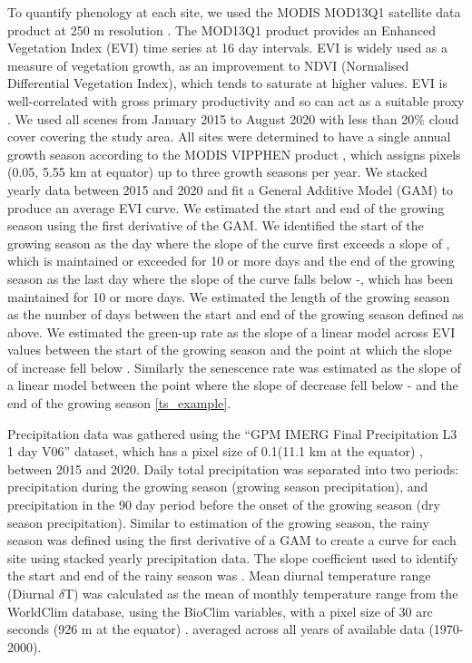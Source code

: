 \documentclass[11pt,a4paper]{article}
\begin{document}
To quantify phenology at each site, we used the MODIS MOD13Q1 satellite data product at 250 m resolution \citep{MOD13Q1}. The MOD13Q1 product provides an Enhanced Vegetation Index (EVI) time series at 16 day intervals. EVI is widely used as a measure of vegetation growth, as an improvement to NDVI (Normalised Differential Vegetation Index), which tends to saturate at higher values. EVI is well-correlated with gross primary productivity and so can act as a suitable proxy \citep{}. We used all scenes from January 2015 to August 2020 with less than 20\% cloud cover covering the study area. All sites were determined to have a single annual growth season according to the MODIS VIPPHEN product \citep{}, which assigns pixels (0.05\textdegree, 5.55 km at equator) up to three growth seasons per year. We stacked yearly data between 2015 and 2020 and fit a General Additive Model (GAM) to produce an average EVI curve. We estimated the start and end of the growing season using the first derivative of the GAM. We identified the start of the growing season as the day where the slope of the curve first exceeds a slope of \modisSLC{}, which is maintained or exceeded for 10 or more days and the end of the growing season as the last day where the slope of the curve falls below -\modisSLC{}, which has been maintained for 10 or more days. We estimated the length of the growing season as the number of days between the start and end of the growing season defined as above. We estimated the green-up rate as the slope of a linear model across EVI values between the start of the growing season and the point at which the slope of increase fell below \modisSLC{}. Similarly the senescence rate was estimated as the slope of a linear model between the point where the slope of decrease fell below -\modisSLC{} and the end of the growing season \autoref{ts_example}.

Precipitation data was gathered using the ``GPM IMERG Final Precipitation L3 1 day V06'' dataset, which has a pixel size of 0.1\textdegree (11.1 km at the equator) \citep{GPM}, between 2015 and 2020. Daily total precipitation was separated into two periods: precipitation during the growing season (growing season precipitation), and precipitation in the 90 day period before the onset of the growing season (dry season precipitation). Similar to estimation of the growing season, the rainy season was defined using the first derivative of a GAM to create a curve for each site using stacked yearly precipitation data. The slope coefficient used to identify the start and end of the rainy season was \trmmSLC{}. Mean diurnal temperature range (Diurnal $\delta$T) was calculated as the mean of monthly temperature range from the WorldClim database, using the BioClim variables, with a pixel size of 30 arc seconds (926 m at the equator) \citep{Fick2017}. averaged across all years of available data (1970-2000).
\end{document}

